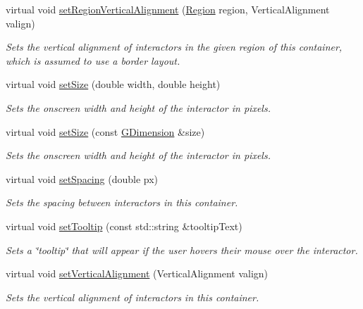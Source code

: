 \begin{DoxyCompactItemize}
virtual void \mbox{\hyperlink{classGContainer_a1efb2d3b67fb479aad27a6c0032ee70e}{set\+Region\+Vertical\+Alignment}} (\mbox{\hyperlink{classGContainer_a81a01a86de31071a92e6cce0bab9bc4b}{Region}} region, Vertical\+Alignment valign)
\begin{DoxyCompactList}\small\item\em Sets the vertical alignment of interactors in the given region of this container, which is assumed to use a border layout. \end{DoxyCompactList}\item 
virtual void \mbox{\hyperlink{classGInteractor_aca25d49481f9bf5fc8f7df4c086c4ce7}{set\+Size}} (double width, double height)
\begin{DoxyCompactList}\small\item\em Sets the onscreen width and height of the interactor in pixels. \end{DoxyCompactList}\item 
virtual void \mbox{\hyperlink{classGInteractor_ae2b628228f192c2702c4ce941b2af68f}{set\+Size}} (const \mbox{\hyperlink{structGDimension}{G\+Dimension}} \&size)
\begin{DoxyCompactList}\small\item\em Sets the onscreen width and height of the interactor in pixels. \end{DoxyCompactList}\item 
virtual void \mbox{\hyperlink{classGContainer_a0f85f7b45435b302ae701cb00574bf52}{set\+Spacing}} (double px)
\begin{DoxyCompactList}\small\item\em Sets the spacing between interactors in this container. \end{DoxyCompactList}\item 
virtual void \mbox{\hyperlink{classGInteractor_a039e0e49beaecc275efce02d416acea8}{set\+Tooltip}} (const std\+::string \&tooltip\+Text)
\begin{DoxyCompactList}\small\item\em Sets a \char`\"{}tooltip\char`\"{} that will appear if the user hovers their mouse over the interactor. \end{DoxyCompactList}\item 
virtual void \mbox{\hyperlink{classGContainer_a465537d012ad40704a011ad927ce435d}{set\+Vertical\+Alignment}} (Vertical\+Alignment valign)
\begin{DoxyCompactList}\small\item\em Sets the vertical alignment of interactors in this container. \end{DoxyCompactList}\item 

\end{DoxyCompactItemize}
